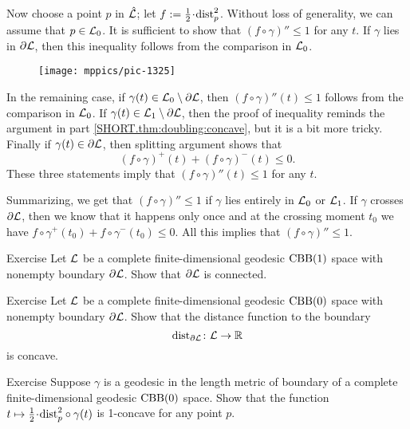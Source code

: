 Now choose a point $p$ in $\hat{\mathcal{L}}$;
let $f\df\tfrac12\cdot\distfun_p^2$.
Without loss of generality, we can assume that $p\in \mathcal{L}_0$.
It is sufficient to show that $(f\circ\gamma)''\le 1$ for any $t$.
If $\gamma$ lies in $\partial \mathcal{L}$, then this inequality follows from the comparison in $\mathcal{L}_0$.

\begin{wrapfigure}{r}{45mm}
\vskip-2mm
\centering
\texttt{[image: mppics/pic-1325]}
\end{wrapfigure}

In the remaining case, if $\gamma(t)\z\in \spc{L}_0\setminus\partial\spc{L}$, then $(f\circ\gamma)''(t)\le 1$ follows from the comparison in $\mathcal{L}_0$.
If $\gamma(t)\in \mathcal{L}_1\setminus\partial\mathcal{L}$, then the proof of inequality reminds the argument in part \ref{SHORT.thm:doubling:concave}, but it is a bit more tricky.
Finally if $\gamma(t)\in\partial\mathcal{L}$, then splitting argument shows that 
\[(f\circ\gamma)^+(t)+(f\circ\gamma)^-(t)\le 0.\]
These three statements imply that $(f\circ\gamma)''(t)\le 1$ for any $t$.

Summarizing, we get that $(f\circ\gamma)''\le 1$ if $\gamma$ lies entirely in $\mathcal{L}_0$ or $\mathcal{L}_1$.
If $\gamma$ crosses $\partial \mathcal{L}$, then we know that it happens only once and at the crossing moment $t_0$ 
we have $f\circ\gamma^+(t_0)+f\circ\gamma^-(t_0)\le 0$.
All this implies that $(f\circ\gamma)''\le 1$.
\qeds

\begin{thm}{Exercise}\label{ex:bry-connected}
Let $\mathcal{L}$ be a complete finite-dimensional geodesic $\mathrm{CBB}(1)$ space with nonempty boundary $\partial\mathcal{L}$.
Show that $\partial\mathcal{L}$ is connected.
\end{thm}


\begin{thm}{Exercise}\label{ex:dist-to-bry}
Let $\mathcal{L}$ be a complete finite-dimensional geodesic $\mathrm{CBB}(0)$ space with nonempty boundary $\partial\mathcal{L}$.
Show that the distance function to the boundary
\[\mathrm{dist}_{\partial\mathcal{L}}\colon\mathcal{L}\to\mathbb{R}\]
is concave.
\end{thm}

\begin{thm}{Exercise}\label{ex:liberman}
Suppose $\gamma$ is a geodesic in the length metric of boundary of a complete finite-dimensional geodesic $\mathrm{CBB}(0)$ space.
Show that the function $t\mapsto \tfrac12\cdot\distfun_p^2\circ\gamma(t)$ is 1-concave for any point $p$. 
\end{thm}

